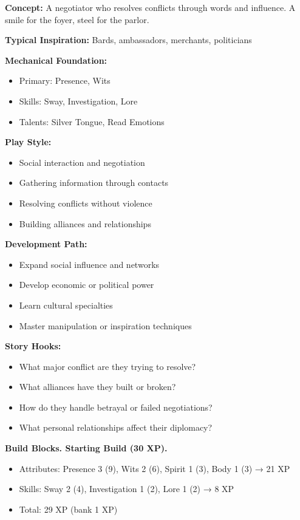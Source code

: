 \documentclass[11pt,twoside,openany]{book}
\begin{document}
\textbf{Concept:} A negotiator who resolves conflicts through words and influence. A smile for the foyer, steel for the parlor.

\textbf{Typical Inspiration:} Bards, ambassadors, merchants, politicians

\textbf{Mechanical Foundation:}
\begin{itemize}
\item Primary: Presence, Wits
\item Skills: Sway, Investigation, Lore
\item Talents: Silver Tongue, Read Emotions
\end{itemize}

\textbf{Play Style:}
\begin{itemize}
\item Social interaction and negotiation
\item Gathering information through contacts
\item Resolving conflicts without violence
\item Building alliances and relationships
\end{itemize}

\textbf{Development Path:}
\begin{itemize}
\item Expand social influence and networks
\item Develop economic or political power
\item Learn cultural specialties
\item Master manipulation or inspiration techniques
\end{itemize}

\textbf{Story Hooks:}
\begin{itemize}
\item What major conflict are they trying to resolve?
\item What alliances have they built or broken?
\item How do they handle betrayal or failed negotiations?
\item What personal relationships affect their diplomacy?
\end{itemize}

\textbf{Build Blocks. Starting Build (30 XP).}
\begin{itemize}
\item Attributes: Presence 3 (9), Wits 2 (6), Spirit 1 (3), Body 1 (3) → 21 XP
\item Skills: Sway 2 (4), Investigation 1 (2), Lore 1 (2) → 8 XP
\item Total: 29 XP (bank 1 XP)
\end{itemize}
\end{document}
